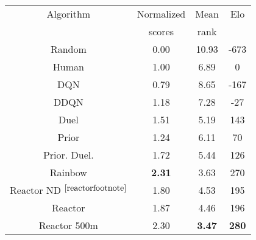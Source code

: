 \begin{tabular}{| c | c | c | c |}
\hline
Algorithm & Normalized & Mean& Elo \\
 & scores & rank &\\
\hline
Random & 0.00 & 10.93 & -673\\
Human & 1.00 & 6.89 & 0\\
DQN & 0.79 & 8.65 & -167\\
DDQN & 1.18 & 7.28 & -27\\
Duel & 1.51 & 5.19 & 143\\
Prior & 1.24 & 6.11 & 70\\
Prior. Duel. & 1.72 & 5.44 & 126\\
Rainbow & {\bf 2.31} & 3.63 & 270\\
Reactor ND $^{\ref{reactorfootnote}}$ & 1.80 & 4.53 & 195\\
Reactor & 1.87 & 4.46 & 196\\
Reactor 500m & 2.30 & {\bf 3.47} & {\bf 280}\\
\hline
\end{tabular}
